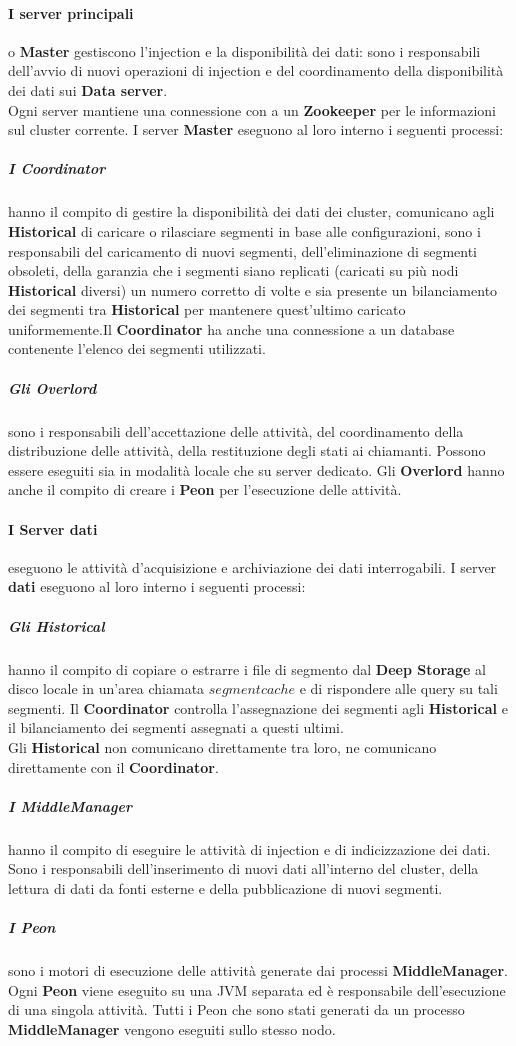 \paragraph{I server principali} o \textbf{Master} gestiscono l’\gls{injection}{} e la disponibilità dei dati: sono i responsabili dell’avvio
di nuovi operazioni di \gls{injection}{} e del coordinamento della disponibilità dei dati sui \textbf{Data server}.\\
Ogni server mantiene una connessione con a un \textbf{Zookeeper} per le informazioni sul \gls{cluster}{} corrente.
I server \textbf{Master} eseguono al loro interno i seguenti processi:
\subparagraph{I Coordinator} hanno il compito di gestire la disponibilità dei dati dei \gls{cluster}{}, comunicano
agli \textbf{Historical} di caricare o rilasciare segmenti in base alle configurazioni, sono i 
responsabili del caricamento di nuovi segmenti, dell’eliminazione di segmenti obsoleti, della
garanzia che i segmenti siano replicati (caricati su più nodi \textbf{Historical} diversi) un
numero corretto  di volte e sia presente un bilanciamento dei segmenti
tra \textbf{Historical} per mantenere quest’ultimo caricato uniformemente.Il \textbf{Coordinator} ha anche una connessione a un database
contenente l’elenco dei segmenti utilizzati. 
\subparagraph{Gli Overlord} sono i responsabili dell’accettazione delle attività, del coordinamento della distribuzione delle
attività, della restituzione degli stati ai
chiamanti. Possono essere eseguiti sia in modalità locale che su server dedicato. Gli \textbf{Overlord} hanno anche il compito di 
creare i \textbf{Peon} per l'esecuzione delle attività. 
\paragraph{I Server dati} eseguono le attività d'acquisizione e archiviazione dei dati interrogabili.
I server \textbf{dati} eseguono al loro interno i seguenti processi:
\subparagraph{Gli Historical} hanno il compito di copiare o estrarre i file di segmento dal \textbf{Deep Storage} al disco locale in un’area
chiamata $segment cache$ e di rispondere alle query su tali segmenti.
Il \textbf{Coordinator} controlla l’assegnazione dei segmenti agli \textbf{Historical} e il bilanciamento dei segmenti assegnati
a questi ultimi.\\ 
Gli \textbf{Historical} non comunicano direttamente tra loro, ne comunicano direttamente con il \textbf{Coordinator}. 
\subparagraph{I MiddleManager} 
hanno il compito di eseguire le attività di \gls{injection}{} e di indicizzazione dei dati.\\
Sono i responsabili dell'inserimento di nuovi dati all'interno del \gls{cluster}{}, della lettura di dati da fonti esterne e della pubblicazione di 
nuovi segmenti.\\
\subparagraph{I Peon} sono i motori di esecuzione delle attività generate dai processi \textbf{MiddleManager}. \\
Ogni \textbf{Peon} viene eseguito su una JVM separata ed è responsabile dell’esecuzione di una singola attività. 
Tutti i Peon che sono stati generati da un processo \textbf{MiddleManager} vengono eseguiti sullo stesso nodo.
